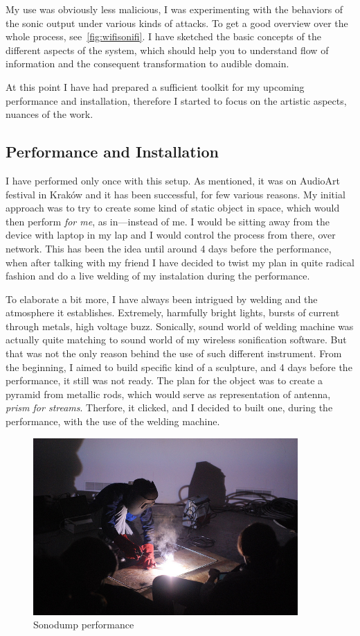 \documentclass[12pt,a4paper,oneside]{report}
\begin{document}
My use was obviously less malicious, I was experimenting with the behaviors of the sonic output under various kinds of attacks. To get a good overview over the whole process, see~\ref{fig:wifisonifi}. I have sketched the basic concepts of the different aspects of the system, which should help you to understand flow of information and the consequent transformation to audible domain.

At this point I have had prepared a sufficient toolkit for my upcoming performance and installation, therefore I started to focus on the artistic aspects, nuances of the work.

\subsection{Performance and Installation}
I have performed only once with this setup. As mentioned, it was on AudioArt festival in Kraków and it has been successful, for few various reasons. My initial approach was to try to create some kind of static object in space, which would then perform \emph{for me}, as in---instead of me. I would be sitting away from the device with laptop in my lap and I would control the process from there, over network. This has been the idea until around 4 days before the performance, when after talking with my friend I have decided to twist my plan in quite radical fashion and do a live welding of my instalation during the performance.

To elaborate a bit more, I have always been intrigued by welding and the atmosphere it establishes. Extremely, harmfully bright lights, bursts of current through metals, high voltage buzz. Sonically, sound world of welding machine was actually quite matching to sound world of my wireless sonification software. But that was not the only reason behind the use of such different instrument. From the beginning, I aimed to build specific kind of a sculpture, and 4 days before the performance, it still was not ready. The plan for the object was to create a pyramid from metallic rods, which would serve as representation of antenna, \textit{prism for streams}. Therfore, it clicked, and I decided to built one, during the performance, with the use of the welding machine.

\begin{figure}  
  \centering
    \includegraphics[width=0.9\textwidth]{img/zvarac}
	\caption{Sonodump performance}
	\label{fig:zvarac}
\end{figure}
\end{document}
